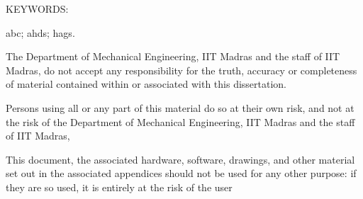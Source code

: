 \documentclass[BTech]{iitmdiss}
\begin{document}


    \acknowledgements

    \lipsum[1]



    \abstract

    \noindent KEYWORDS: \hspace*{0.5em} \parbox[t]{4.4in}{abc; ahds; hags.}

    \vspace*{24pt}
    \noindent
    \lipsum[2]


    \pagebreak

    \disclaimer
    The Department of Mechanical Engineering, IIT Madras and the staff of IIT Madras, do not accept any responsibility for the truth, accuracy or completeness of material contained within or associated with this dissertation.

    Persons using all or any part of this material do so at their own risk, and not at the risk of the Department of Mechanical Engineering, IIT Madras and the staff of IIT Madras,

    This document, the associated hardware, software, drawings, and other material set out in the associated appendices should not be used for any other purpose: if they are so used, it is entirely at the risk of the user

    \pagebreak



    \begin{singlespace}
        \tableofcontents
        \thispagestyle{empty}

        \listoftables
        \listoffigures
    \end{singlespace}
\end{document}
